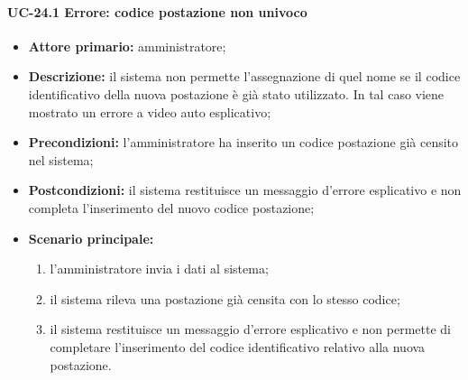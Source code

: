 \paragraph{UC-24.1 Errore: codice postazione non univoco}
    \begin{itemize}
	\item \textbf{Attore primario:} amministratore;
	\item \textbf{Descrizione:} il sistema non permette l'assegnazione di quel nome se il codice identificativo della nuova postazione è già stato utilizzato. In tal caso viene mostrato un errore a video auto esplicativo;
	\item \textbf{Precondizioni:} l'amministratore ha inserito un codice postazione già censito nel sistema;
	\item \textbf{Postcondizioni:} il sistema restituisce un messaggio d'errore esplicativo e non completa l'inserimento del nuovo codice postazione;
	\item \textbf{Scenario principale:}
	      \begin{enumerate}
	      	      \item l'amministratore invia i dati al sistema;
		      \item il sistema rileva una postazione già censita con lo stesso codice;
		      \item il sistema restituisce un messaggio d'errore esplicativo e non permette di completare l'inserimento del codice identificativo relativo alla nuova postazione.
	      \end{enumerate}
\end{itemize}
    
